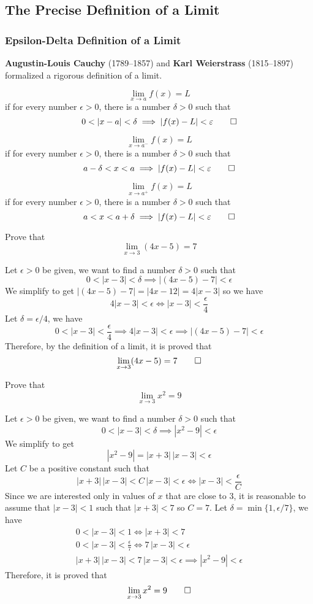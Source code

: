 \subsection{The Precise Definition of a Limit}

\subsubsection{Epsilon-Delta Definition of a Limit}
\textbf{Augustin-Louis Cauchy} (1789--1857) and \textbf{Karl Weierstrass}
(1815--1897) formalized a rigorous definition of a limit.
\begin{definition}
    \[\lim_{x\to a}f(x)=L\] if for every number \(\epsilon>0\), there is a
    number \(\delta>0\) such that
    \[0<|x-a|<\delta\implies|f(x)-L|<\epsilon\qedhere\]
\end{definition}
\begin{definition}
    \[\lim_{x\to a^-}f(x)=L\] if for every number \(\epsilon>0\), there is a
    number \(\delta>0\) such that
    \[a-\delta<x<a\implies|f(x)-L|<\epsilon\qedhere\]
\end{definition}
\begin{definition}
    \[\lim_{x\to a^+}f(x)=L\] if for every number \(\epsilon>0\), there is a
    number \(\delta>0\) such that
    \[a<x<a+\delta\implies|f(x)-L|<\epsilon\qedhere\]
\end{definition}
\begin{problem}
    Prove that \[\lim_{x\to 3}(4x-5)=7\]
\end{problem}
\begin{solution}
    Let \(\epsilon>0\) be given, we want to find a number \(\delta>0\) such
    that \[0<|x-3|<\delta \implies|(4x-5)-7|<\epsilon\]
    We simplify to get \(|(4x-5)-7|=|4x-12|=4|x-3|\) so we have
    \[4|x-3|<\epsilon\iff|x-3|<\frac{\epsilon}{4}\]
    Let \(\delta=\epsilon/4\), we have
    \[0<|x-3|<\frac{\epsilon}{4}\implies4|x-3|<\epsilon\implies
    |(4x-5)-7|<\epsilon\]
    Therefore, by the definition of a limit, it is proved that
    \[\lim_{x\to 3}(4x-5)=7\qedhere\]
\end{solution}
\begin{problem}
    Prove that \[\lim_{x\to 3}x^2=9\]
\end{problem}
\begin{solution}
    Let \(\epsilon>0\) be given, we want to find a number \(\delta>0\) such
    that \[0<|x-3|<\delta\implies|x^2-9|<\epsilon\]
    We simplify to get \[|x^2-9|=|x+3|\,|x-3|<\epsilon\]
    Let \(C\) be a positive constant such that
    \[|x+3|\,|x-3|<C\,|x-3|<\epsilon \iff |x-3|<\frac{\epsilon}{C}\]
    Since we are interested only in values of \(x\) that are close to 3, it is
    reasonable to assume that \(|x-3|<1\) such that \(|x+3|<7\) so \(C=7\).
    Let \(\delta=\min\{1,\epsilon/7\}\), we have
    \begin{gather*}
        0<|x-3|<1\iff|x+3|<7 \\ 0<|x-3|<\frac{\epsilon}{7}\iff
        7\,|x-3|<\epsilon \\ |x+3|\,|x-3|<7\,|x-3|<\epsilon\implies
        |x^2-9|<\epsilon
    \end{gather*}
    Therefore, it is proved that \[\lim_{x\to 3}x^2=9\qedhere\]
\end{solution}
